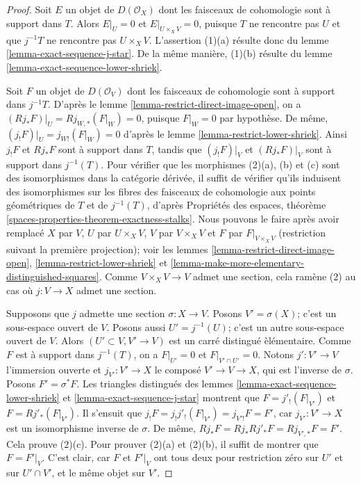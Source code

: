\begin{proof}
Soit $E$ un objet de $D(\mathcal{O}_X)$ dont les faisceaux de cohomologie
sont \`a support dans $T$. Alors $E|_U = 0$ et
$E|_{U \times_X V} = 0$, puisque $T$ ne rencontre pas $U$ et que $j^{-1}T$
ne rencontre pas $U \times_X V$. L'assertion (1)(a) r\'esulte donc du
lemme \ref{lemma-exact-sequence-j-star}. De la m\^eme mani\`ere, (1)(b)
r\'esulte du lemme \ref{lemma-exact-sequence-lower-shriek}.

\medskip\noindent
Soit $F$ un objet de $D(\mathcal{O}_V)$ dont les faisceaux de cohomologie
sont \`a support dans $j^{-1}T$. D'apr\`es le
lemme \ref{lemma-restrict-direct-image-open}, on a
$(Rj_*F)|_U = Rj_{W, *}(F|_W) = 0$, puisque $F|_W = 0$ par hypoth\`ese.
De m\^eme, $(j_!F)|_U = j_{W!}(F|_W) = 0$ d'apr\`es le
lemme \ref{lemma-restrict-lower-shriek}. Ainsi $j_!F$ et $Rj_*F$ sont \`a
support dans $T$, tandis que $(j_!F)|_V$ et $(Rj_*F)|_V$ sont \`a support
dans $j^{-1}(T)$. Pour v\'erifier que les morphismes (2)(a), (b) et (c) sont
des isomorphismes dans la cat\'egorie d\'eriv\'ee, il suffit de v\'erifier
qu'ils induisent des isomorphismes sur les fibres des faisceaux de
cohomologie aux points g\'eom\'etriques de $T$ et de $j^{-1}(T)$, d'apr\`es
Propri\'et\'es des espaces, th\'eor\`eme
\ref{spaces-properties-theorem-exactness-stalks}.
Nous pouvons le faire apr\`es avoir remplac\'e $X$ par $V$, $U$ par
$U \times_X V$, $V$ par $V \times_X V$ et $F$ par $F|_{V \times_X V}$
(restriction suivant la premi\`ere projection); voir les lemmes
\ref{lemma-restrict-direct-image-open},
\ref{lemma-restrict-lower-shriek} et
\ref{lemma-make-more-elementary-distinguished-squares}.
Comme $V \times_X V \to V$ admet une section, cela ram\`ene (2) au cas o\`u
$j : V \to X$ admet une section.

\medskip\noindent
Supposons que $j$ admette une section $\sigma : X \to V$. Posons
$V' = \sigma(X)$; c'est un sous-espace ouvert de $V$. Posons aussi
$U' = j^{-1}(U)$; c'est un autre sous-espace ouvert de $V$. Alors
$(U' \subset V, V' \to V)$ est un carr\'e distingu\'e \`el\'ementaire.
Comme $F$ est \`a support dans $j^{-1}(T)$, on a $F|_{U'} = 0$ et
$F|_{V' \cap U'} = 0$. Notons $j' : V' \to V$ l'immersion ouverte et
$j_{V'} : V' \to X$ le compos\'e $V' \to V \to X$, qui est l'inverse de
$\sigma$. Posons $F' = \sigma^*F$. Les triangles distingu\'es des lemmes
\ref{lemma-exact-sequence-lower-shriek} et
\ref{lemma-exact-sequence-j-star} montrent que
$F = j'_!(F|_{V'})$ et $F = Rj'_*(F|_{V'})$. Il s'ensuit que
$j_!F = j_!j'_!(F|_{V'}) = j_{V'!}F = F'$, car
$j_{V'} : V' \to X$ est un isomorphisme inverse de $\sigma$. De m\^eme,
$Rj_*F = Rj_*Rj'_*F = Rj_{V', *}F = F'$. Cela prouve (2)(c). Pour prouver
(2)(a) et (2)(b), il suffit de montrer que $F = F'|_V$. C'est clair, car
$F$ et $F'|_V$ ont tous deux pour restriction z\'ero sur $U'$ et sur
$U' \cap V'$, et le m\^eme objet sur $V'$.
\end{proof}

